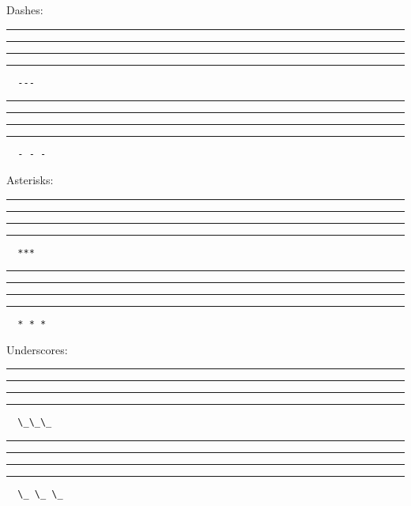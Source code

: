 Dashes:

\rule{0.5\textwidth}{.4pt}

\rule{0.5\textwidth}{.4pt}

\rule{0.5\textwidth}{.4pt}

\rule{0.5\textwidth}{.4pt}
\begin{verbatim}
  ---
\end{verbatim}

\rule{0.5\textwidth}{.4pt}

\rule{0.5\textwidth}{.4pt}

\rule{0.5\textwidth}{.4pt}

\rule{0.5\textwidth}{.4pt}
\begin{verbatim}
  - - -
\end{verbatim}

Asterisks:

\rule{0.5\textwidth}{.4pt}

\rule{0.5\textwidth}{.4pt}

\rule{0.5\textwidth}{.4pt}

\rule{0.5\textwidth}{.4pt}
\begin{verbatim}
  ***
\end{verbatim}

\rule{0.5\textwidth}{.4pt}

\rule{0.5\textwidth}{.4pt}

\rule{0.5\textwidth}{.4pt}

\rule{0.5\textwidth}{.4pt}
\begin{verbatim}
  * * *
\end{verbatim}

Underscores:

\rule{0.5\textwidth}{.4pt}

\rule{0.5\textwidth}{.4pt}

\rule{0.5\textwidth}{.4pt}

\rule{0.5\textwidth}{.4pt}
\begin{verbatim}
  \_\_\_
\end{verbatim}

\rule{0.5\textwidth}{.4pt}

\rule{0.5\textwidth}{.4pt}

\rule{0.5\textwidth}{.4pt}

\rule{0.5\textwidth}{.4pt}
\begin{verbatim}
  \_ \_ \_
\end{verbatim}